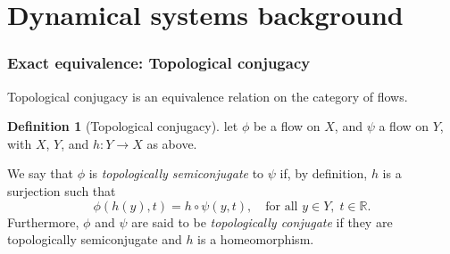\documentclass{article}
\theoremstyle{definition} \newtheorem{definition}{Definition}  \newtheorem{example}{Example}
\theoremstyle{remark} \newtheorem{remark}{Remark}
\newcounter{ct}
\begin{document}
%
%
%
%
%
%






\newpage
\section{Dynamical systems background}

%



\subsubsection{Exact equivalence: Topological conjugacy}\label{sec:top_conj}

Topological conjugacy is an equivalence relation on the category of flows. %
\begin{definition}[Topological conjugacy]\label{def:top_conj}
let $\phi$ be a flow on $X$, and $\psi$ a flow on $Y$, with $X$, $Y$, and $h\colon Y \to X$ as above.

We say that $\phi$ is \emph{topologically semiconjugate} to $\psi$ if, by definition, $h$ is a surjection such that
\[
\phi(h(y), t) = h \circ \psi(y, t), \quad \text{for all } y \in Y, \; t \in \mathbb{R}.
\]
Furthermore, $\phi$ and $\psi$ are said to be \emph{topologically conjugate} if they are topologically semiconjugate and $h$ is a homeomorphism.
\end{definition}
\end{document}
